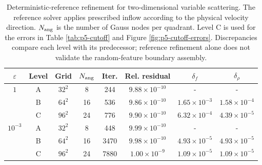 \begin{table}[!htb]
\centering\small
\setlength{\tabcolsep}{3.5pt}
\caption{Deterministic-reference refinement for two-dimensional variable scattering. The reference solver applies prescribed inflow according to the physical velocity direction. $N_{\rm ang}$ is the number of Gauss nodes per quadrant. Level C is used for the errors in Table \ref{tab:p5-cutoff} and Figure \ref{fig:p5-cutoff-errors}. Discrepancies compare each level with its predecessor; reference refinement alone does not validate the random-feature boundary assembly.}
\label{tab:p5-reference}
\begin{tabular}{cccccccc}
\toprule
$\varepsilon$ & Level & Grid & $N_{\rm ang}$ & Iter. & Rel. residual & $\delta_f$ & $\delta_\rho$\\
\midrule
$1$ & A & $32^2$ & 8 & 244 & $9.88\times10^{-10}$ & - & -\\
 & B & $64^2$ & 16 & 536 & $9.86\times10^{-10}$ & $1.65\times10^{-3}$ & $1.58\times10^{-4}$\\
 & C & $96^2$ & 24 & 776 & $9.90\times10^{-10}$ & $6.32\times10^{-4}$ & $4.39\times10^{-5}$\\
\addlinespace
$10^{-3}$ & A & $32^2$ & 8 & 448 & $9.99\times10^{-10}$ & - & -\\
 & B & $64^2$ & 16 & 3470 & $9.98\times10^{-10}$ & $4.93\times10^{-5}$ & $4.93\times10^{-5}$\\
 & C & $96^2$ & 24 & 7880 & $1.00\times10^{-9}$ & $1.09\times10^{-5}$ & $1.09\times10^{-5}$\\
\bottomrule
\end{tabular}
\end{table}

